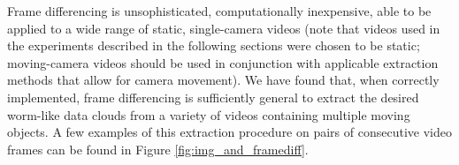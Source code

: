 \documentclass[smallcondensed, final]{svjour3}
\newcommand{\willie}[1]{\textcolor{green}{\textsf{\emph{\textbf{\textcolor{green}{#1}}}}}}
\begin{document}
Frame differencing is unsophisticated, computationally inexpensive, able to be applied to a wide range of static, single-camera videos (note that videos used in the experiments described in the following sections were chosen to be static; moving-camera videos should be used in conjunction with applicable extraction methods that allow for camera movement). We have found that, when correctly implemented, frame differencing is sufficiently general to extract the desired worm-like data clouds from a variety of videos containing multiple moving objects. A few examples of this extraction procedure on pairs of consecutive video frames can be found in Figure \ref{fig:img_and_framediff}.

\end{document}

